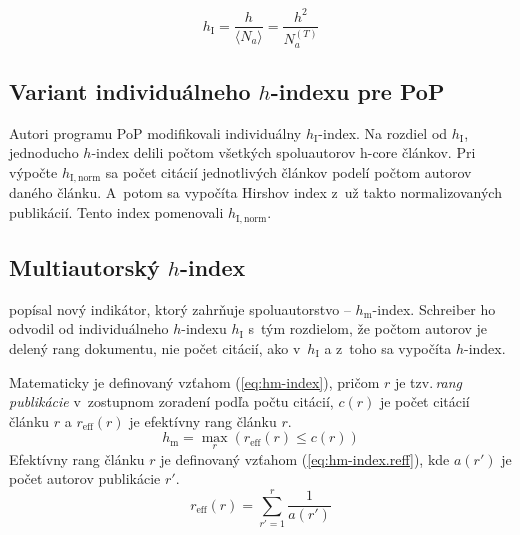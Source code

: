\begin{equation}
\label{eq:hi-index}
h_{\mathrm{I}} = \frac{h}{\langle N_a \rangle} = \frac{h^2}{N_a^{(T)}}
\end{equation}


\subsection{Variant individuálneho $h$-indexu pre PoP}
\label{sec:hinorm}

Autori programu PoP modifikovali individuálny
$h_{\mathrm{I}}$-index.    Na rozdiel od $h_{\mathrm{I}}$, jednoducho
$h$-index delili počtom všetkých
spoluautorov h-core článkov.  Pri výpočte $h_{\mathrm{I, norm}}$ sa počet
citácií jednotlivých článkov podelí počtom autorov daného článku.  A~potom sa
vypočíta Hirshov index z~už takto normalizovaných publikácií.  Tento index pomenovali $h_{\mathrm{I, norm}}$.


\subsection{Multiautorský $h$-index}
\label{sec:hm-index}

\citet{Schreiber2008} popísal nový indikátor, ktorý zahrňuje spoluautorstvo
-- $h_{\mathrm{m}}$-index.  Schreiber ho odvodil od individuálneho $h$-indexu
$h_{\mathrm{I}}$ s~tým rozdielom, že počtom autorov je delený rang dokumentu,
nie počet citácií, ako v~$h_{\mathrm{I}}$ a z~toho sa vypočíta $h$-index.

Matematicky je definovaný vzťahom (\ref{eq:hm-index}), pričom $r$ je tzv.\,\emph{rang
  publikácie} v~zostupnom zoradení podľa počtu citácií, $c(r)$ je počet citácií
článku $r$ a $r_{\mathrm{eff}}(r)$ je efektívny rang článku $r$.
\begin{equation}
\label{eq:hm-index}
h_{\mathrm{m}} = \max_r{(r_{\mathrm{eff}}(r) \leq c(r))}
\end{equation}
Efektívny rang článku $r$ je definovaný vzťahom (\ref{eq:hm-index.reff}), kde $a(r')$ je
počet autorov publikácie $r'$.
\begin{equation}
\label{eq:hm-index.reff}
r_{\mathrm{eff}}(r) = \sum_{r'=1}^r{\frac{1}{a(r')}}
\end{equation}


